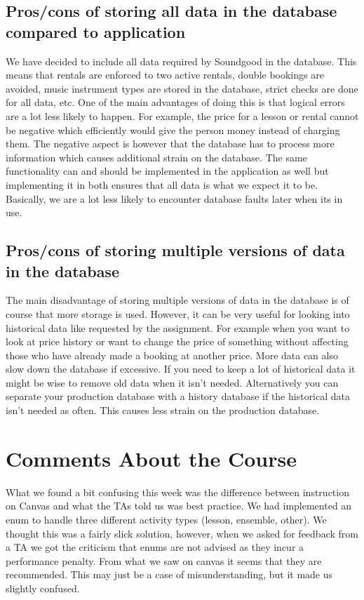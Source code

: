 \documentclass[a4paper]{scrartcl}
\begin{document}
\subsection{Pros/cons of storing all data in the database compared to application}
We have decided to include all data required by Soundgood in the database. This means that rentals are enforced to two active rentals, double bookings are avoided, music instrument types are stored in the database, strict checks are done for all data, etc. One of the main advantages of doing this is that logical errors are a lot less likely to happen. For example, the price for a lesson or rental cannot be negative which efficiently would give the person money instead of charging them. The negative aspect is however that the database has to process more information which causes additional strain on the database. The same functionality can and should be implemented in the application as well but implementing it in both ensures that all data is what we expect it to be. Basically, we are a lot less likely to encounter database faults later when its in use.

\subsection{Pros/cons of storing multiple versions of data in the database}
The main disadvantage of storing multiple versions of data in the database is of course that more storage is used. However, it can be very useful for looking into historical data like requested by the assignment. For example when you want to look at price history or want to change the price of something without affecting those who have already made a booking at another price. More data can also slow down the database if excessive. If you need to keep a lot of historical data it might be wise to remove old data when it isn't needed. Alternatively you can separate your production database with a history database if the historical data isn't needed as often. This causes less strain on the production database.

\section{Comments About the Course}

What we found a bit confusing this week was the difference between instruction on Canvas and what the TAs told us was best practice. We had implemented an enum to handle three different activity types (lesson, ensemble, other). We thought this was a fairly slick solution, however, when we asked for feedback from a TA we got the criticism that enums are not advised as they incur a performance penalty. From what we saw on canvas it seems that they are recommended. This may just be a case of misunderstanding, but it made us slightly confused.
\end{document}

